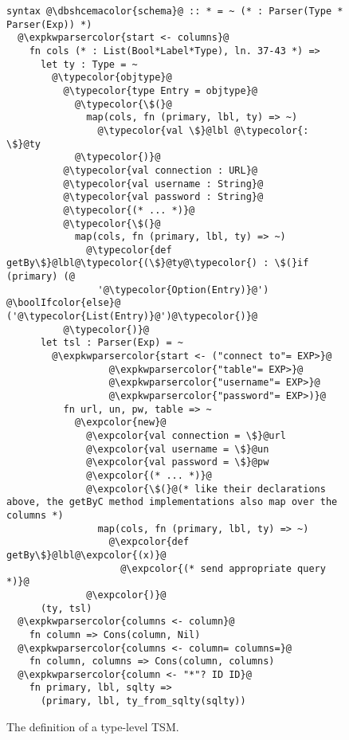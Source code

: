 \documentclass{sig-alternate}[10pt]
\newcommand{\expkwparsercolor}[1]{\textcolor[HTML]{336699}{#1}}
\newcommand{\expcolor}[1]{\textcolor[HTML]{FF0033}{#1}}
\newcommand{\typecolor}[1]{\textcolor[HTML]{660066}{#1}}
\newcommand{\boolIfcolor}[1]{\textcolor[HTML]{5E0C0C}{#1}}
\newcommand{\dbshcemacolor}[1]{\textcolor[HTML]{0A5306}{#1}}
\newcommand{\mycaption}[1]{\vspace{-5px}\caption{#1}\vspace{-5px}}
\begin{document}
\begin{figure}[t]
\begin{lstlisting}[style=wyvern]
syntax @\dbshcemacolor{schema}@ :: * = ~ (* : Parser(Type * Parser(Exp)) *)
  @\expkwparsercolor{start <- columns}@
    fn cols (* : List(Bool*Label*Type), ln. 37-43 *) =>
      let ty : Type = ~
        @\typecolor{objtype}@ 
          @\typecolor{type Entry = objtype}@
            @\typecolor{\$(}@
              map(cols, fn (primary, lbl, ty) => ~)
                @\typecolor{val \$}@lbl @\typecolor{:  \$}@ty
            @\typecolor{)}@
          @\typecolor{val connection : URL}@
          @\typecolor{val username : String}@
          @\typecolor{val password : String}@
          @\typecolor{(* ... *)}@
          @\typecolor{\$(}@
            map(cols, fn (primary, lbl, ty) => ~)
              @\typecolor{def getBy\$}@lbl@\typecolor{(\$}@ty@\typecolor{) : \$(}if (primary) (@
                '@\typecolor{Option(Entry)}@') @\boolIfcolor{else}@ ('@\typecolor{List(Entry)}@')@\typecolor{)}@
          @\typecolor{)}@
      let tsl : Parser(Exp) = ~ 
        @\expkwparsercolor{start <- ("connect to"= EXP>}@
                  @\expkwparsercolor{"table"= EXP>}@
                  @\expkwparsercolor{"username"= EXP>}@
                  @\expkwparsercolor{"password"= EXP>)}@
          fn url, un, pw, table => ~
            @\expcolor{new}@ 
              @\expcolor{val connection = \$}@url
              @\expcolor{val username = \$}@un
              @\expcolor{val password = \$}@pw
              @\expcolor{(* ... *)}@
              @\expcolor{\$(}@(* like their declarations above, the getByC method implementations also map over the columns *)
                map(cols, fn (primary, lbl, ty) => ~)
                  @\expcolor{def getBy\$}@lbl@\expcolor{(x)}@ 
                    @\expcolor{(* send appropriate query *)}@
              @\expcolor{)}@
      (ty, tsl)
  @\expkwparsercolor{columns <- column}@
    fn column => Cons(column, Nil)
  @\expkwparsercolor{columns <- column= columns=}@
    fn column, columns => Cons(column, columns)
  @\expkwparsercolor{column <- "*"? ID ID}@
    fn primary, lbl, sqlty => 
      (primary, lbl, ty_from_sqlty(sqlty))
\end{lstlisting}
\mycaption{The definition of a type-level TSM.}
\label{typekw-example-1}
\end{figure}
\end{document}
